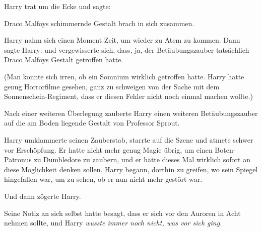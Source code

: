 Harry trat um die Ecke und sagte: 

Draco Malfoys schimmernde Gestalt brach in sich zusammen.

Harry nahm sich einen Moment Zeit, um wieder zu Atem zu kommen. Dann sagte Harry:  und vergewisserte sich, dass, ja, der Betäubungszauber tatsächlich Draco Malfoys Gestalt getroffen hatte.

(Man konnte sich irren, ob ein Somnium wirklich getroffen hatte. Harry hatte genug Horrorfilme gesehen, ganz zu schweigen von der Sache mit dem Sonnenschein-Regiment, dass er diesen Fehler nicht noch einmal machen wollte.)

Nach einer weiteren Überlegung zauberte Harry einen weiteren Betäubungszauber auf die am Boden liegende Gestalt von Professor Sprout.

Harry umklammerte seinen Zauberstab, starrte auf die Szene und atmete schwer vor Erschöpfung. Er hatte nicht mehr genug Magie übrig, um einen Boten-Patronus zu Dumbledore zu zaubern, und er hätte dieses Mal wirklich sofort an diese Möglichkeit denken sollen. Harry begann, dorthin zu greifen, wo sein Spiegel hingefallen war, um zu sehen, ob er nun nicht mehr gestört war.

Und dann zögerte Harry.

Seine Notiz an sich selbst hatte besagt, dass er sich vor den Auroren in Acht nehmen sollte, und Harry \emph{wusste immer noch nicht, was vor sich ging.}

